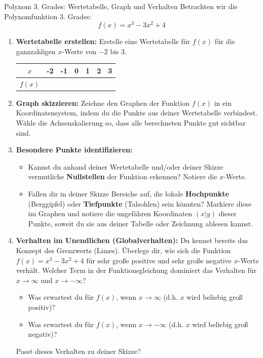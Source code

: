 \begin{aufgabenumgebung}{Polynom 3. Grades: Wertetabelle, Graph und Verhalten}
Betrachten wir die Polynomfunktion 3. Grades:
\[ f(x) = x^3 - 3x^2 + 4 \]
\begin{enumerate}[label=(\alph*)]
    \item \textbf{Wertetabelle erstellen:} Erstelle eine Wertetabelle für $f(x)$ für die ganzzahligen $x$-Werte von $-2$ bis $3$.
    \begin{center}
    \begin{tabular}{c||c|c|c|c|c|c}
    $x$ & -2 & -1 & 0 & 1 & 2 & 3 \\
    \hline
    $f(x)$ &    &    &   &   &   &   \\
    \end{tabular}
    \end{center}
    \item \textbf{Graph skizzieren:} Zeichne den Graphen der Funktion $f(x)$ in ein Koordinatensystem, indem du die Punkte aus deiner Wertetabelle verbindest. Wähle die Achsenskalierung so, dass alle berechneten Punkte gut sichtbar sind.
    \item \textbf{Besondere Punkte identifizieren:}
    \begin{itemize}
        \item Kannst du anhand deiner Wertetabelle und/oder deiner Skizze vermutliche \textbf{Nullstellen} der Funktion erkennen? Notiere die $x$-Werte.
        \item Fallen dir in deiner Skizze Bereiche auf, die lokale \textbf{Hochpunkte} (Berggipfel) oder \textbf{Tiefpunkte} (Talsohlen) sein könnten? Markiere diese im Graphen und notiere die ungefähren Koordinaten $(x|y)$ dieser Punkte, soweit du sie aus deiner Tabelle oder Zeichnung ablesen kannst.
    \end{itemize}
    \item \textbf{Verhalten im Unendlichen (Globalverhalten):}
    Du kennst bereits das Konzept des Grenzwerts (Limes). Überlege dir, wie sich die Funktion $f(x) = x^3 - 3x^2 + 4$ für sehr große positive und sehr große negative $x$-Werte verhält. Welcher Term in der Funktionsgleichung dominiert das Verhalten für $x \to \infty$ und $x \to -\infty$?
    \begin{itemize}
        \item Was erwartest du für $f(x)$, wenn $x \to \infty$ (d.h. $x$ wird beliebig groß positiv)?
        \item Was erwartest du für $f(x)$, wenn $x \to -\infty$ (d.h. $x$ wird beliebig groß negativ)?
    \end{itemize}
    Passt dieses Verhalten zu deiner Skizze?
\end{enumerate}
\end{aufgabenumgebung}